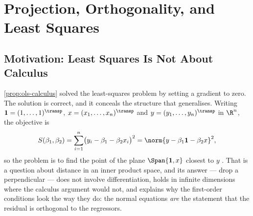 
\chapter{Projection, Orthogonality, and Least Squares}
\label{ch:projection}

\section{Motivation: Least Squares Is Not About Calculus}\label{sec:proj-motivation}

\autoref{prop:ols-calculus} solved the least-squares problem by setting a
gradient to zero. The solution is correct, and it conceals the structure that generalises. Writing $\mathbf1=(1,\dots,1)^{\transp}$,
$x=(x_1,\dots,x_n)^{\transp}$ and $y=(y_1,\dots,y_n)^{\transp}$ in $\R^n$, the
objective is
\begin{equation}\label{eq:ols-norm}
	S(\beta_1,\beta_2)=\sum_{i=1}^n\bigl(y_i-\beta_1-\beta_2x_i\bigr)^2
	=\norm{y-\beta_1\mathbf1-\beta_2x}^2 ,
\end{equation}
so the problem is to find the point of the plane $\Span\{\mathbf1,x\}$ closest to
$y$ \autocite[slide 61]{fukuda2026calculus}. That is a question about distance in
an inner product space, and its answer --- drop a perpendicular --- does not
involve differentiation, holds in infinite dimensions where the calculus argument
would not, and explains why the first-order conditions look the way they do:
the normal equations \emph{are} the statement that the residual is orthogonal to
the regressors.

